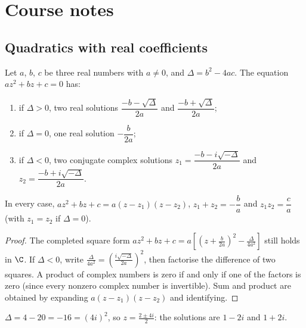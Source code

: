\mxnewpage
\section{Course notes}
\subsection{Quadratics with real coefficients}
\begin{theorem}[Solving in $\C$]
Let $a$, $b$, $c$ be three real numbers with $a\neq0$, and $\Delta=b^2-4ac$. The equation $az^2+bz+c=0$ has:
\begin{enumerate}
\item if $\Delta>0$, two real solutions $\dfrac{-b-\sqrt\Delta}{2a}$ and $\dfrac{-b+\sqrt\Delta}{2a}$;
\item if $\Delta=0$, one real solution $-\dfrac b{2a}$;
\item if $\Delta<0$, two conjugate complex solutions $z_1=\dfrac{-b-i\sqrt{-\Delta}}{2a}$ and $z_2=\dfrac{-b+i\sqrt{-\Delta}}{2a}$.
\end{enumerate}
In every case, $az^2+bz+c=a(z-z_1)(z-z_2)$, $z_1+z_2=-\dfrac ba$ and $z_1z_2=\dfrac ca$ (with $z_1=z_2$ if $\Delta=0$).
\end{theorem}
\begin{proof}
The completed square form $az^2+bz+c=a\left[\left(z+\frac b{2a}\right)^2-\frac\Delta{4a^2}\right]$ still holds in $\C$. If $\Delta<0$, write $\frac{\Delta}{4a^2}=\left(\frac{i\sqrt{-\Delta}}{2a}\right)^2$, then factorise the difference of two squares. A product of complex numbers is zero if and only if one of the factors is zero (since every nonzero complex number is invertible). Sum and product are obtained by expanding $a(z-z_1)(z-z_2)$ and identifying.
\end{proof}
\begin{example}[Solving $z^2-2z+5=0$]
$\Delta=4-20=-16=(4i)^2$, so $z=\frac{2\pm4i}2$: the solutions are $1-2i$ and $1+2i$.
\end{example}

